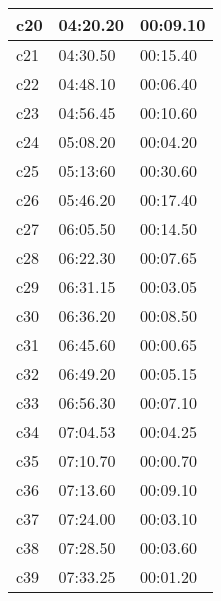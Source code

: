 \documentclass[a4paper,10pt]{report}
\begin{document}
\begin{longtable}[|c|]{|l|l|l|}
    c20                             & 04:20.20                        & 00:09.10 \\ \hline
    c21                             & 04:30.50                        & 00:15.40 \\ \hline
    c22                             & 04:48.10                        & 00:06.40 \\ \hline
    c23                             & 04:56.45                        & 00:10.60 \\ \hline
    c24                             & 05:08.20                        & 00:04.20 \\ \hline
    c25                             & 05:13:60                        & 00:30.60 \\ \hline
    c26                             & 05:46.20                        & 00:17.40 \\ \hline
    c27                             & 06:05.50                        & 00:14.50 \\ \hline
    c28                             & 06:22.30                        & 00:07.65 \\ \hline
    c29                             & 06:31.15                        & 00:03.05 \\ \hline
    c30                             & 06:36.20                        & 00:08.50 \\ \hline
    c31                             & 06:45.60                        & 00:00.65 \\ \hline
    c32                             & 06:49.20                        & 00:05.15 \\ \hline
    c33                             & 06:56.30                        & 00:07.10 \\ \hline
    c34                             & 07:04.53                        & 00:04.25 \\ \hline
    c35                             & 07:10.70                        & 00:00.70 \\ \hline
    c36                             & 07:13.60                        & 00:09.10 \\ \hline
    c37                             & 07:24.00                        & 00:03.10 \\ \hline
    c38                             & 07:28.50                        & 00:03.60 \\ \hline
    c39                             & 07:33.25                        & 00:01.20 \\ \hline

\end{longtable}
\end{document}
